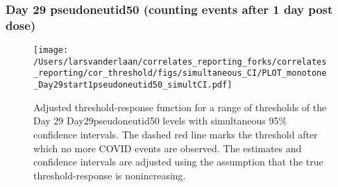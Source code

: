 \documentclass[]{article}
\begin{document}
\clearpage
\clearpage

\clearpage

\hypertarget{day-29-pseudoneutid50-counting-events-after-1-day-post-dose-3}{%
\subsubsection{Day 29 pseudoneutid50 (counting events after 1 day post
dose)}\label{day-29-pseudoneutid50-counting-events-after-1-day-post-dose-3}}

\begin{figure}[H]
\centering
\texttt{[image: /Users/larsvanderlaan/correlates\_reporting\_forks/correlates\_reporting/cor\_threshold/figs/simultaneous\_CI/PLOT\_monotone\_Day29start1pseudoneutid50\_simultCI.pdf]}
\caption{Adjusted threshold-response function for a range of thresholds of the
  Day 29 Day29pseudoneutid50 levels with simultaneous 95\% confidence intervals. The dashed red line marks the threshold after which no more COVID events are observed. The estimates and confidence intervals are adjusted using the assumption that the true threshold-response is nonincreasing.}
\end{figure}
\end{document}
